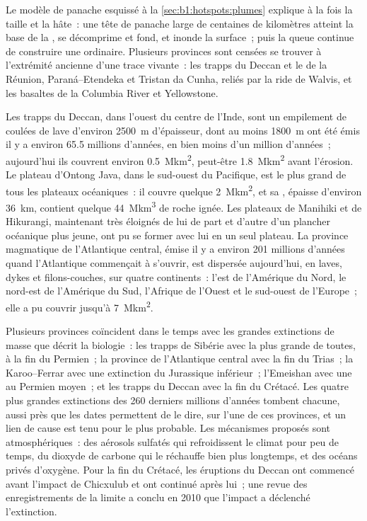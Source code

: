 \noindent Le modèle de panache esquissé à la \cref{sec:b1:hotspots:plumes} explique à la fois la
taille et la hâte~: une tête de panache large de centaines de kilomètres atteint la base
de la , se décomprime et fond, et inonde la surface~; puis la
queue continue de construire une  ordinaire. Plusieurs provinces sont censées
se trouver à l'extrémité ancienne d'une trace vivante~: les trapps du Deccan et le  de
la Réunion, Paraná--Etendeka et Tristan da Cunha, reliés par la ride de Walvis,
et les basaltes de la Columbia River et Yellowstone.

Les trapps du Deccan, dans l'ouest du centre de l'Inde, sont un empilement de coulées de lave d'environ
\qty{2500}{m} d'épaisseur, dont au moins \qty{1800}{m} ont été émis il y a environ
65.5 millions d'années, en bien moins d'un million d'années~; aujourd'hui ils couvrent
environ \qty{0.5}{\mega km^2}, peut-être \qty{1.8}{\mega km^2} avant l'érosion. Le
plateau d'Ontong Java, dans le sud-ouest du Pacifique, est le plus grand de tous les
plateaux océaniques~: il couvre quelque \qty{2}{\mega km^2}, et sa , épaisse d'environ
\qty{36}{km}, contient quelque \qty{44}{\mega km^3} de roche ignée. Les
plateaux de Manihiki et de Hikurangi, maintenant très éloignés de lui de part et d'autre d'un plancher océanique
plus jeune, ont pu se former avec lui en un seul plateau. La province magmatique de
l'Atlantique central, émise il y a environ 201 millions d'années quand l'Atlantique commençait à
s'ouvrir, est dispersée aujourd'hui, en laves, dykes et filons-couches, sur quatre continents~:
l'est de l'Amérique du Nord, le nord-est de l'Amérique du Sud, l'Afrique de l'Ouest et
le sud-ouest de l'Europe~; elle a pu couvrir jusqu'à \qty{7}{\mega km^2}.


Plusieurs provinces coïncident dans le temps avec les grandes extinctions de masse que
décrit la biologie~: les trapps de Sibérie avec la plus grande de toutes, à la fin du
Permien~; la province de l'Atlantique central avec la fin du Trias~; la
Karoo--Ferrar avec une extinction du Jurassique inférieur~; l'Emeishan avec une
au Permien moyen~; et les trapps du Deccan avec la fin du Crétacé. Les
quatre plus grandes extinctions des 260 derniers millions d'années tombent chacune, aussi près
que les dates permettent de le dire, sur l'une de ces provinces, et un lien de cause est
tenu pour le plus probable. Les mécanismes proposés sont atmosphériques~: des aérosols
sulfatés qui refroidissent le climat pour peu de temps, du dioxyde de carbone qui le réchauffe
bien plus longtemps, et des océans privés d'oxygène. Pour la fin du Crétacé,
les éruptions du Deccan ont commencé avant l'impact de Chicxulub et ont continué après
lui~; une revue des enregistrements de la limite a conclu en 2010 que l'impact
a déclenché l'extinction.

